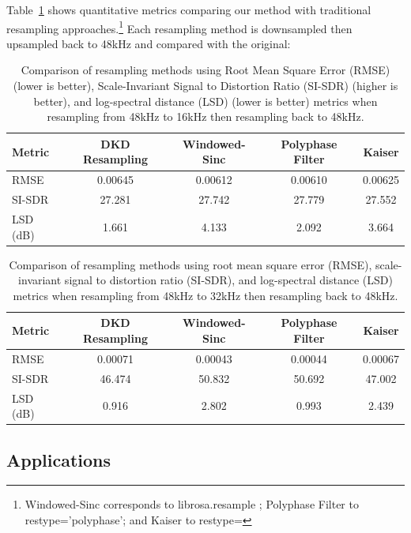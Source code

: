 \documentclass[11pt,twoside]{report}
\numberwithin{thm}{section}
\numberwithin{equation}{section}
\begin{document}
Table~\ref{tab:resample_metrics} shows quantitative metrics comparing our method with traditional resampling approaches.\footnote{Windowed-Sinc corresponds to librosa.resample ; Polyphase Filter to  res\textunderscore type='polyphase'; and Kaiser to res\textunderscore type=} Each resampling method is downsampled then upsampled back to 48kHz and compared with the original:

\begin{table}[h]
\centering
\begin{tabular}{|l|c|c|c|c|}
\hline
\textbf{Metric} & \textbf{DKD Resampling} & \textbf{Windowed-Sinc} & \textbf{Polyphase Filter} & \textbf{Kaiser}\\
\hline
RMSE & 0.00645 & 0.00612 & 0.00610 & 0.00625\\
\hline
SI-SDR & 27.281 & 27.742 & 27.779 & 27.552 \\
\hline
LSD (dB) & 1.661 & 4.133 & 2.092 & 3.664 \\
\hline
\end{tabular}
\caption{Comparison of resampling methods using Root Mean Square Error (RMSE) (lower is better), Scale-Invariant Signal to Distortion Ratio (SI-SDR) (higher is better), and log-spectral distance (LSD) (lower is better) metrics when resampling from 48kHz to 16kHz then resampling back to 48kHz.}
\label{tab:resample_metrics}
\end{table}

\begin{table}[h]
\centering
\begin{tabular}{|l|c|c|c|c|}
\hline
\textbf{Metric} & \textbf{DKD Resampling} & \textbf{Windowed-Sinc} & \textbf{Polyphase Filter} & \textbf{Kaiser}\\
\hline
RMSE & 0.00071 & 0.00043 & 0.00044 & 0.00067 \\
\hline
SI-SDR & 46.474 & 50.832 & 50.692 & 47.002 \\
\hline
LSD (dB) & 0.916 & 2.802 & 0.993 & 2.439 \\
\hline
\end{tabular}
\caption{Comparison of resampling methods using root mean square error (RMSE), scale-invariant signal to distortion ratio (SI-SDR), and log-spectral distance (LSD) metrics when resampling from 48kHz to 32kHz then resampling back to 48kHz.}
\label{tab:resample_metrics_32}
\end{table}
\newpage
\subsection{Applications}
\end{document}
